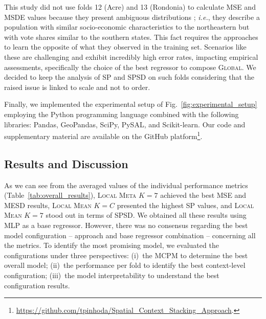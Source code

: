 \documentclass[runningheads]{llncs}
\begin{document}
This study did not use folds 12 (Acre) and 13 (Rondonia) to calculate MSE and MSDE values because they present ambiguous distributions \cite{jiang2019spatial}; \textit{i.e.}, they describe a population with similar socio-economic characteristics to the northeastern but with vote shares similar to the southern states. This fact requires the approaches to learn the opposite of what they observed in the training set. Scenarios like these are challenging and exhibit incredibly high error rates, impacting empirical assessments, specifically the choice of the best regressor to compose \textsc{Global}. We decided to keep the analysis of SP and SPSD on such folds considering that the raised issue is linked to scale and not to order.

Finally, we implemented the experimental setup of Fig.~\ref{fig:experimental_setup} employing the Python programming language combined with the following libraries: Pandas, GeoPandas, SciPy, PySAL, and Scikit-learn. Our code and supplementary material are available on the GitHub platform\footnote{\url{https://github.com/tpinhoda/Spatial\_Context\_Stacking\_Approach}.}.



\subsection{Results and Discussion}

As we can see from the averaged values of the individual performance metrics (Table~\ref{tab:overall_results}), \textsc{Local  Meta $K=7$} achieved the best MSE and MESD results, \textsc{Local Mean $K=C$} presented the highest SP values, and \textsc{Local Mean $K=7$} stood out in terms of SPSD. We obtained all these results using MLP as a base regressor. However, there was no consensus regarding the best model configuration -- approach and base regressor combination -- concerning all the metrics. To identify the most promising model, we evaluated the configurations under three perspectives: (i)~the MCPM to determine the best overall model; (ii)~the performance per fold to identify the best context-level configuration; (iii)~the model interpretability to understand the best configuration results.
\end{document}
